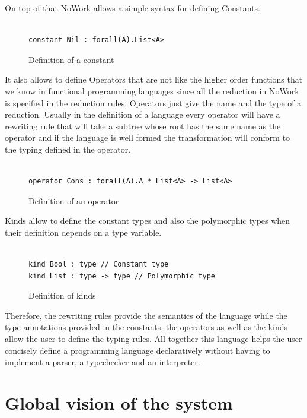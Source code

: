 \documentclass[12pt,a4paper]{article}
\begin{document}
On top of that NoWork allows a simple syntax for defining Constants.

\begin{figure}[!h]
\begin{verbatim}

constant Nil : forall(A).List<A>
\end{verbatim}
\caption{Definition of a constant}
\end{figure}


It also allows to define Operators that are not like the higher order functions
that we know in functional programming languages since all the
reduction in NoWork is specified in the reduction rules. Operators
just give the name and the type of a reduction. Usually in the
definition of a language every operator will have a rewriting rule
that will take a subtree whose root has the same name as the operator
and if the language is well formed the transformation will conform to
the typing defined in the operator.


\begin{figure}[!h]
\begin{verbatim}

operator Cons : forall(A).A * List<A> -> List<A>

\end{verbatim}
\caption{Definition of an operator}
\end{figure}

Kinds allow to define the constant types and also the polymorphic types when
their definition depends on a type variable.

\begin{figure}[!h]
\begin{verbatim}

kind Bool : type // Constant type
kind List : type -> type // Polymorphic type
\end{verbatim}
\caption{Definition of kinds}
\end{figure}

Therefore, the rewriting rules provide the semantics of the language
while the type annotations provided in the constants, the operators as well
as the kinds allow the user to define the typing rules. All together
this language helps the user concisely define a programming language
declaratively without having to implement a parser, a typechecker and
an interpreter.

\section{Global vision of the system}
\end{document}
